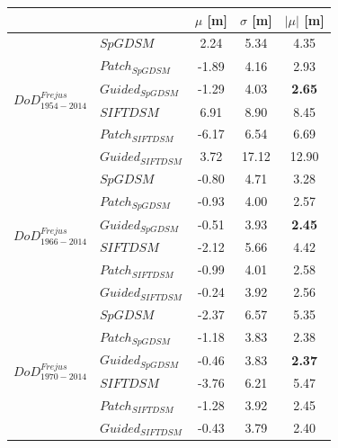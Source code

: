 \begin{table}%
	\footnotesize
	\centering
	\begin{tabular}{||l|l|c|c|c||}\hline
		& &$\mu$ [m]&$\sigma$ [m]&$|\mu|$ [m]\\\hline\hline
\multirow{6}{*}{$DoD^{Frejus}_{1954-2014}$}
&${SpGDSM}$ & 2.24 & 5.34 & {4.35}\\
&${Patch_{SpGDSM}}$ & -1.89 & 4.16 & 2.93\\
&${Guided_{SpGDSM}}$ & -1.29 & 4.03 & \textbf{2.65}\\
&${SIFTDSM}$ & 6.91 & 8.90 & 8.45\\
&${Patch_{SIFTDSM}}$ & -6.17 & 6.54 & 6.69\\
&${Guided_{SIFTDSM}}$ & 3.72 & 17.12 & 12.90\\\hline

\multirow{6}{*}{$DoD^{Frejus}_{1966-2014}$}
&${SpGDSM}$ & -0.80 & 4.71 & {3.28}\\
&${Patch_{SpGDSM}}$ & -0.93 & 4.00 & 2.57\\
&${Guided_{SpGDSM}}$ & -0.51 & 3.93 & \textbf{2.45}\\
&${SIFTDSM}$ & -2.12 & 5.66 & 4.42\\
&${Patch_{SIFTDSM}}$ & -0.99 & 4.01 & 2.58\\
&${Guided_{SIFTDSM}}$ & -0.24 & 3.92 & 2.56\\\hline


\multirow{6}{*}{$DoD^{Frejus}_{1970-2014}$}
&${SpGDSM}$ & -2.37 & 6.57 & {5.35}\\
&${Patch_{SpGDSM}}$ & -1.18 & 3.83 & 2.38\\
&${Guided_{SpGDSM}}$ & -0.46 & 3.83 & \textbf{2.37}\\
&${SIFTDSM}$ & -3.76 & 6.21 & 5.47\\
&${Patch_{SIFTDSM}}$ & -1.28 & 3.92 & 2.45\\
&${Guided_{SIFTDSM}}$ & -0.43 & 3.79 & 2.40\\\hline


\end{tabular}
\end{table}
